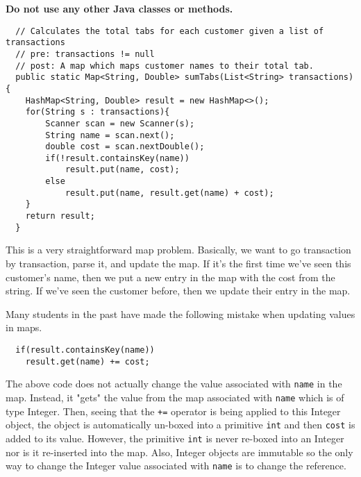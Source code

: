\documentclass[12pt,letter]{article}
\begin{document}
\noindent \textbf{Do not use any other Java classes or methods.}

\clearpage
\begin{verbatim}
  // Calculates the total tabs for each customer given a list of transactions
  // pre: transactions != null
  // post: A map which maps customer names to their total tab.
  public static Map<String, Double> sumTabs(List<String> transactions) {
    HashMap<String, Double> result = new HashMap<>();
    for(String s : transactions){
        Scanner scan = new Scanner(s);
        String name = scan.next();
        double cost = scan.nextDouble();
        if(!result.containsKey(name))
            result.put(name, cost);
        else
            result.put(name, result.get(name) + cost);
    }
    return result;
  }
\end{verbatim}

\vspace{4pt}
\noindent This is a very straightforward map problem. Basically, we want to go transaction by transaction, parse it, and update the map.
If it's the first time we've seen this customer's name, then we put a new entry in the map with the cost from the string. If 
we've seen the customer before, then we update their entry in the map. \newline

\noindent Many students in the past have made the following mistake when updating values in maps.
\begin{verbatim}
  if(result.containsKey(name))
    result.get(name) += cost;
\end{verbatim}
The above code does not actually change the value associated with \texttt{name} in the map. Instead, it "gets" the value from the map associated
with \texttt{name} which is of type Integer. Then, seeing that the \texttt{+=} operator is being applied to this Integer object, the object
is automatically un-boxed into a primitive \texttt{int} and then \texttt{cost} is added to its value. However, the primitive \texttt{int}
is never re-boxed into an Integer nor is it re-inserted into the map. Also, Integer objects are immutable so the only way to change
the Integer value associated with \texttt{name} is to change the reference. \newline
\end{document}
